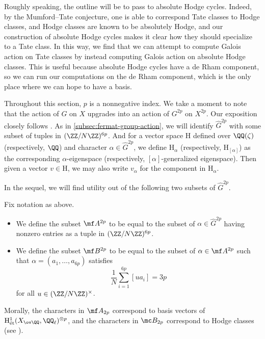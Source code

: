\documentclass[../thesis.tex]{subfiles}
\begin{document}
Roughly speaking, the outline will be to pass to absolute Hodge cycles. Indeed, by the Mumford--Tate conjecture, one is able to correspond Tate classes to Hodge classes, and Hodge classes are known to be absolutely Hodge, and our construction of absolute Hodge cycles makes it clear how they should specialize to a Tate class. In this way, we find that we can attempt to compute Galois action on Tate classes by instead computing Galois action on absolute Hodge classes. This is useful because absolute Hodge cycles have a de Rham component, so we can run our computations on the de Rham component, which is the only place where we can hope to have a basis.

Throughout this section, $p$ is a nonnegative index. We take a moment to note that the action of $G$ on $X$ upgrades into an action of $G^{2p}$ on $X^{2p}$. Our exposition closely follows \cite[Subsection~8.5]{ggl-fermat}. As in \cref{subsec:fermat-group-action}, we will identify $\widehat G^{2p}$ with some subset of tuples in $(\ZZ/N\ZZ)^{6p}$. And for a vector space $\mathrm H$ defined over $\QQ(\zeta)$ (respectively, $\QQ$) and character $\alpha\in\widehat G^{2p}$, we define $\mathrm H_\alpha$ (respectively, $\mathrm H_{[\alpha]}$) as the corresponding $\alpha$-eigenspace (respectively, $[\alpha]$-generalized eigenspace). Then given a vector $v\in\mathrm H$, we may also write $v_\alpha$ for the component in $\mathrm H_\alpha$.

In the sequel, we will find utility out of the following two subsets of $\widehat G^{2p}$.
\begin{definition}
	Fix notation as above.
	\begin{itemize}
		\item We define the subset $\mf A^{2p}$ to be equal to the subset of $\alpha\in\widehat G^{2p}$ having nonzero entries as a tuple in $(\ZZ/N\ZZ)^{6p}$.
		\item We define the subset $\mf B^{2p}$ to be equal to the subset of $\alpha\in\mf A^{2p}$ such that $\alpha=(a_1,\ldots,a_{6p})$ satisfies
		\[\frac1N\sum_{i=1}^{6p}[ua_i]=3p\]
		for all $u\in(\ZZ/N\ZZ)^\times$.
	\end{itemize}
\end{definition}
Morally, the characters in $\mf A_{2p}$ correspond to basis vectors of $\mathrm H^1_{\mathrm{\acute et}}(X_{\ov\QQ},\QQ_\ell)^{\otimes p}$, and the characters in $\mc B_{2p}$ correspond to Hodge classes (see ).
\end{document}

